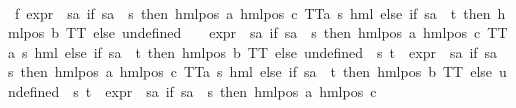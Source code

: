 \begin{isabellebody}
\ \ \ \ \ \ \ \ \isamarkupfalse%
\ f{}{\isacharcolon}{\kern0pt}\ {\isachardoublequoteopen}{\isacharparenleft}{\kern0pt}expr{\isacharunderscore}{\kern0pt}{}\ {\isasymcirc}\ {\isacharparenleft}{\kern0pt}{\isasymlambda}sa{\isachardot}{\kern0pt}\ if\ sa\ {\isacharequal}{\kern0pt}\ s\ then\ hml{\isacharunderscore}{\kern0pt}pos\ a\ {\isacharparenleft}{\kern0pt}hml{\isacharunderscore}{\kern0pt}pos\ c\ {\isacharparenleft}{\kern0pt}TT{\isacharcolon}{\kern0pt}{\isacharcolon}{\kern0pt}{\isacharparenleft}{\kern0pt}{\isacharprime}{\kern0pt}a{\isacharcomma}{\kern0pt}\ {\isacharprime}{\kern0pt}s{\isacharparenright}{\kern0pt}\ hml{\isacharparenright}{\kern0pt}{\isacharparenright}{\kern0pt}\ else\ if\ sa\ {\isacharequal}{\kern0pt}\ t\ then\ hml{\isacharunderscore}{\kern0pt}pos\ b\ TT\ else\ undefined{\isacharparenright}{\kern0pt}{\isacharparenright}{\kern0pt}\ {\isacharbackquote}{\kern0pt}\ {\isacharbraceleft}{\kern0pt}{\isacharbraceright}{\kern0pt}\ {\isasymunion}\ {\isacharparenleft}{\kern0pt}expr{\isacharunderscore}{\kern0pt}{}\ {\isasymcirc}\ {\isacharparenleft}{\kern0pt}{\isasymlambda}sa{\isachardot}{\kern0pt}\ if\ sa\ {\isacharequal}{\kern0pt}\ s\ then\ hml{\isacharunderscore}{\kern0pt}pos\ a\ {\isacharparenleft}{\kern0pt}hml{\isacharunderscore}{\kern0pt}pos\ c\ {\isacharparenleft}{\kern0pt}TT{\isacharcolon}{\kern0pt}{\isacharcolon}{\kern0pt}{\isacharparenleft}{\kern0pt}{\isacharprime}{\kern0pt}a{\isacharcomma}{\kern0pt}\ {\isacharprime}{\kern0pt}s{\isacharparenright}{\kern0pt}\ hml{\isacharparenright}{\kern0pt}{\isacharparenright}{\kern0pt}\ else\ if\ sa\ {\isacharequal}{\kern0pt}\ t\ then\ hml{\isacharunderscore}{\kern0pt}pos\ b\ TT\ else\ undefined{\isacharparenright}{\kern0pt}{\isacharparenright}{\kern0pt}\ {\isacharbackquote}{\kern0pt}\ {\isacharbraceleft}{\kern0pt}s{\isacharcomma}{\kern0pt}\ t{\isacharbraceright}{\kern0pt}\ {\isasymunion}\ {\isacharparenleft}{\kern0pt}expr{\isacharunderscore}{\kern0pt}{}\ {\isasymcirc}\ {\isacharparenleft}{\kern0pt}{\isasymlambda}sa{\isachardot}{\kern0pt}\ if\ sa\ {\isacharequal}{\kern0pt}\ s\ then\ hml{\isacharunderscore}{\kern0pt}pos\ a\ {\isacharparenleft}{\kern0pt}hml{\isacharunderscore}{\kern0pt}pos\ c\ {\isacharparenleft}{\kern0pt}TT{\isacharcolon}{\kern0pt}{\isacharcolon}{\kern0pt}{\isacharparenleft}{\kern0pt}{\isacharprime}{\kern0pt}a{\isacharcomma}{\kern0pt}\ {\isacharprime}{\kern0pt}s{\isacharparenright}{\kern0pt}\ hml{\isacharparenright}{\kern0pt}{\isacharparenright}{\kern0pt}\ else\ if\ sa\ {\isacharequal}{\kern0pt}\ t\ then\ hml{\isacharunderscore}{\kern0pt}pos\ b\ TT\ else\ undefined{\isacharparenright}{\kern0pt}{\isacharparenright}{\kern0pt}\ {\isacharbackquote}{\kern0pt}\ {\isacharbraceleft}{\kern0pt}s{\isacharcomma}{\kern0pt}\ t{\isacharbraceright}{\kern0pt}\ {\isacharequal}{\kern0pt}\ {\isacharparenleft}{\kern0pt}expr{\isacharunderscore}{\kern0pt}{}\ {\isasymcirc}\ {\isacharparenleft}{\kern0pt}{\isasymlambda}sa{\isachardot}{\kern0pt}\ if\ sa\ {\isacharequal}{\kern0pt}\ s\ then\ hml{\isacharunderscore}{\kern0pt}pos\ a\ {\isacharparenleft}{\kern0pt}hml{\isacharunderscore}{\kern0pt}pos\ c\ 
\end{isabellebody}
